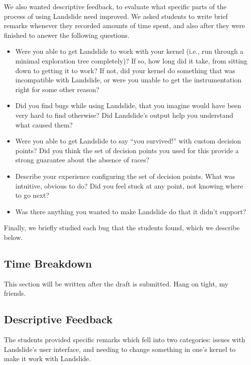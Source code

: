 We also wanted descriptive feedback, to evaluate what specific parts of the process of using Landslide need improved. We asked students to write brief remarks whenever they recorded amounts of time spent, and also after they were finished to answer the following questions.

\begin{itemize}
	\item Were you able to get Landslide to work with your kernel (i.e., run through a minimal exploration tree completely)? If so, how long did it take, from sitting down to getting it to work? If not, did your kernel do something that was incompatible with Landslide, or were you unable to get the instrumentation right for some other reason?
	\item Did you find bugs while using Landslide, that you imagine would have been very hard to find otherwise? Did Landslide's output help you understand what caused them?
	\item Were you able to get Landslide to say ``you survived!'' with custom decision points? Did you think the set of decision points you used for this provide a strong guarantee about the absence of races?
	\item Describe your experience configuring the set of decision points. What was intuitive, obvious to do? Did you feel stuck at any point, not knowing where to go next?
	\item Was there anything you wanted to make Landslide do that it didn't support?
\end{itemize}

Finally, we briefly studied each bug that the students found, which we describe below.

\subsection{Time Breakdown}

This section will be written after the draft is submitted. Hang on tight, my friends.

\subsection{Descriptive Feedback}
\label{sec:eval-feedback}

The students provided specific remarks which fell into two categories: issues with Landslide's user interface, and needing to change something in one's kernel to make it work with Landslide.

